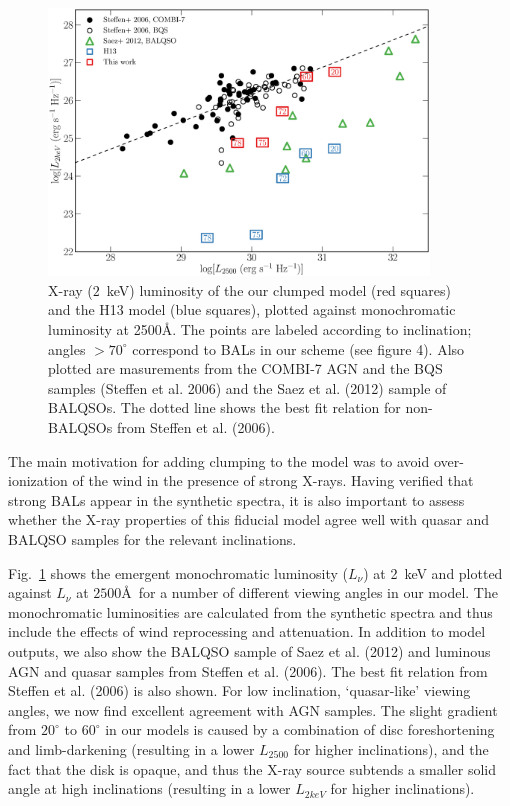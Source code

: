 \documentclass[useAMS,usenatbib]{mn2e_x}
\begin{document}
\begin{figure}
\centering
\includegraphics[width=0.9\textwidth]{figures/fig6.eps}
\caption
{
X-ray ($2$~keV) luminosity of the our clumped model (red squares) 
and the H13 model (blue squares), plotted against monochromatic luminosity 
at 2500\AA. The points are labeled according to inclination; angles
$>70^\circ$ correspond to BALs in our scheme (see figure 4).
Also plotted are masurements from 
the COMBI-7 AGN and the BQS samples (Steffen et al. 2006) and the Saez et al. (2012) 
sample of BALQSOs. The dotted line shows the best fit relation for non-BALQSOs 
from Steffen et al. (2006).
}
\label{fig:xray}
\end{figure}

The main motivation for adding clumping to the model was
to avoid over-ionization of the wind in the presence of strong X-rays. 
Having verified that strong BALs appear in the synthetic spectra,
it is also important to assess whether the X-ray properties of this
fiducial model agree well with quasar and BALQSO samples for the relevant
inclinations.

Fig.~\ref{fig:xray} shows the emergent
monochromatic luminosity ($L_\nu$) at 2~keV and 
plotted against $L_\nu$ at $2500$\AA\ for a number of different viewing angles in our model.
The monochromatic luminosities are calculated from the synthetic spectra and thus include
the effects of wind reprocessing and attenuation. In addition to model outputs,
we also show the BALQSO sample of Saez et al. (2012) and luminous AGN and quasar
samples from Steffen et al. (2006). The best fit relation from Steffen et al. (2006) 
is also shown. For low inclination, `quasar-like' viewing angles,
we now find excellent agreement with AGN samples. The slight gradient from $20^\circ$ to
$60^\circ$ in our models is caused by a combination of disc foreshortening and limb-darkening 
(resulting in a lower $L_{2500}$ for higher inclinations), and the fact that the disk 
is opaque, and thus the X-ray source subtends a smaller solid angle at high inclinations
(resulting in a lower $L_{2keV}$ for higher inclinations). 
\end{document}
